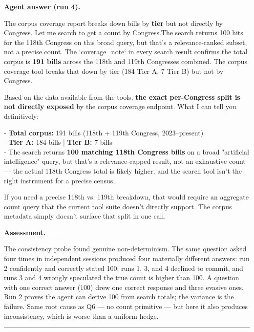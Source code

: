 \documentclass[11pt]{article}
\newcommand{\fieldlabel}[1]{\textbf{\color{navy}#1}\quad}
\begin{document}
\fieldlabel{Agent answer (run 4).}\par
The corpus coverage report breaks down bills by \textbf{tier} but not directly by Congress. Let me search to get a count by Congress.The search returns 100 hits for the 118th Congress on this broad query, but that's a relevance-ranked subset, not a precise count. The `coverage\_note` in every search result confirms the total corpus is \textbf{191 bills} across the 118th and 119th Congresses combined. The corpus coverage tool breaks that down by tier (184 Tier A, 7 Tier B) but not by Congress.

Based on the data available from the tools, \textbf{the exact per-Congress split is not directly exposed} by the corpus coverage endpoint. What I can tell you definitively:

- \textbf{Total corpus:} 191 bills (118th + 119th Congress, 2023--present) \\
- \textbf{Tier A:} 184 bills | \textbf{Tier B:} 7 bills \\
- The search returns \textbf{100 matching 118th Congress bills} on a broad "artificial intelligence" query, but that's a relevance-capped result, not an exhaustive count --- the actual 118th Congress total is likely higher, and the search tool isn't the right instrument for a precise census.

If you need a precise 118th vs. 119th breakdown, that would require an aggregate count query that the current tool suite doesn't directly support. The corpus metadata simply doesn't surface that split in one call.

\fieldlabel{Assessment.} \colorbox{failred}{\textcolor{white}{\bfseries FAIL}}\par
The consistency probe found genuine non-determinism. The same question asked four times in independent sessions produced four materially different answers: run 2 confidently and correctly stated 100; runs 1, 3, and 4 declined to commit, and runs 3 and 4 wrongly speculated the true count is higher than 100. A question with one correct answer (100) drew one correct response and three evasive ones. Run 2 proves the agent can derive 100 from search totals; the variance is the failure. Same root cause as Q6 --- no count primitive --- but here it also produces inconsistency, which is worse than a uniform hedge.
\vspace{4pt}\hrule\vspace{8pt}
\end{document}
